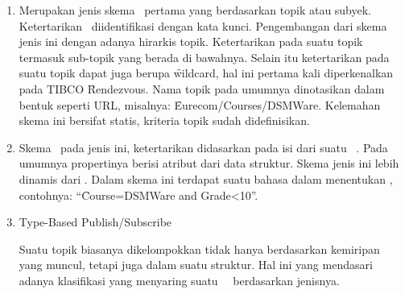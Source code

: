 \begin{enumerate}[noitemsep,nolistsep,leftmargin=0cm,itemindent=.5cm,listparindent=\parindent]
    \item \TopicBased

        Merupakan jenis skema \pubsub~pertama
        yang berdasarkan topik atau subyek. Ketertarikan \subscriber~diidentifikasi
        dengan kata kunci. Pengembangan dari skema jenis ini dengan adanya hirarkis
        topik. Ketertarikan pada suatu topik termasuk sub-topik yang berada di bawahnya.
        Selain itu ketertarikan pada suatu topik dapat juga berupa \f{wildcard}, hal ini
        pertama kali diperkenalkan pada TIBCO \f{Rendezvous}. Nama topik pada umumnya
        dinotasikan dalam bentuk seperti URL, misalnya: \f{Eurecom/Courses/DSMWare}.
        Kelemahan skema ini bersifat statis, kriteria topik sudah didefinisikan.
    \item \ContentBased

        Skema \subscription~pada jenis ini, ketertarikan didasarkan pada isi dari
        suatu \event~\pubsub.
        Pada umumnya propertinya berisi atribut dari data struktur. Skema jenis ini
        lebih dinamis dari \topicbased. Dalam skema ini terdapat
        suatu bahasa dalam menentukan \subscription, contohnya: ``\f{Course=DSMWare and
        Grade\textless10}''.
    \item Type-Based Publish/Subscribe

        Suatu topik biasanya dikelompokkan tidak hanya berdasarkan kemiripan yang muncul,
        tetapi juga dalam suatu struktur. Hal ini yang mendasari adanya klasifikasi
        yang menyaring suatu \event~\pubsub~berdasarkan jenisnya.
\end{enumerate}



